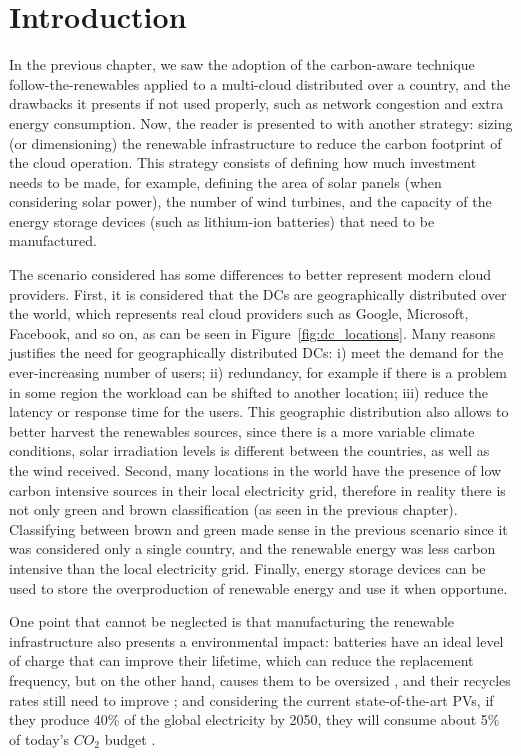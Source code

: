 \section{Introduction}

In the previous chapter, we saw the adoption of the carbon-aware technique follow-the-renewables applied to a multi-cloud distributed over a country, and the drawbacks it presents if not used properly, such as network congestion and extra energy consumption. Now, the reader is presented to with another strategy: sizing (or dimensioning) the renewable infrastructure to reduce the carbon footprint of the cloud operation. This strategy consists of defining how much investment needs to be made, for example, defining the area of solar panels (when considering solar power), the number of wind turbines, and the capacity of the energy storage devices (such as lithium-ion batteries) that need to be manufactured. 

The scenario considered has some differences to better represent modern cloud providers. First, it is considered that the DCs are geographically distributed over the world, which represents real cloud providers such as Google, Microsoft, Facebook, and so on, as can be seen in Figure~\ref{fig:dc_locations}. Many reasons justifies the need for geographically distributed DCs: i) meet the demand for the ever-increasing number of users; ii) redundancy, for example if there is a problem in some region the workload can be shifted to another location; iii) reduce the latency or response time for the users. This geographic distribution also allows to better harvest the renewables sources, since there is a more variable climate conditions, solar irradiation levels is different between the countries, as well as the wind received. Second, many locations in the world have the presence of low carbon intensive sources in their local electricity grid, therefore in reality there is not only green and brown classification (as seen in the previous chapter). Classifying between brown and green made sense in the previous scenario since it was considered only a single country, and the renewable energy was less carbon intensive than the local electricity grid. Finally, energy storage devices can be used to store the overproduction of renewable energy and use it when opportune.

One point that cannot be neglected is that manufacturing the renewable infrastructure also presents a environmental impact: batteries have an ideal level of charge that can improve their lifetime, which can reduce the replacement frequency, but on the other hand, causes them to be oversized \cite{batteries_baumman}, and their recycles rates still need to improve \cite{bateries_RAHMAN}; and considering the current state-of-the-art PVs, if they produce 40\% of the global electricity by 2050, they will consume about 5\% of today’s ${CO_2}$ budget \cite{solar_co2}.

